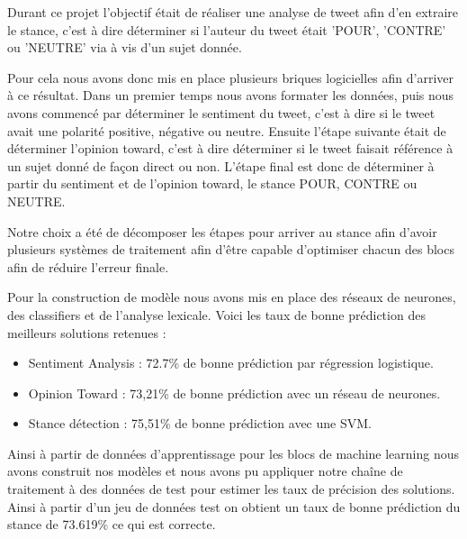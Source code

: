 \par Durant ce projet l'objectif était de réaliser une analyse de tweet afin d'en extraire le stance, c'est à dire déterminer si l'auteur du tweet était 'POUR', 'CONTRE' ou 'NEUTRE' via à vis d'un sujet donnée. \\

\par Pour cela nous avons donc mis en place plusieurs briques logicielles afin d'arriver à ce résultat. Dans un premier temps nous avons formater les données, puis nous avons commencé par déterminer le sentiment du tweet, c'est à dire si le tweet avait une polarité positive, négative ou neutre. Ensuite l'étape suivante était de déterminer l'opinion toward, c'est à dire déterminer si le tweet faisait référence à un sujet donné de façon direct ou non. L'étape final est donc de déterminer à partir du sentiment et de l'opinion toward, le stance POUR, CONTRE ou NEUTRE. \\

\par Notre choix a été de décomposer les étapes pour arriver au stance afin d'avoir plusieurs systèmes de traitement afin d'être capable d'optimiser chacun des blocs afin de réduire l'erreur finale.  \\

\par Pour la construction de modèle nous avons mis en place des réseaux de neurones, des classifiers et de l'analyse lexicale. Voici les taux de bonne prédiction des meilleurs solutions retenues : \\
\begin{itemize}
	\item Sentiment Analysis : 72.7\% de bonne prédiction par régression logistique.
	\item Opinion Toward : 73,21\%  de bonne prédiction avec un réseau de neurones.
	\item Stance détection : 75,51\% de bonne prédiction avec une SVM.
\end{itemize}

\par Ainsi à partir de données d'apprentissage pour les blocs de machine learning nous avons construit nos modèles et nous avons pu appliquer notre chaîne de traitement à des données de test pour estimer les taux de précision des solutions. Ainsi à partir d'un jeu de données test on obtient un taux de bonne prédiction du stance de 73.619\% ce qui est correcte. \\

